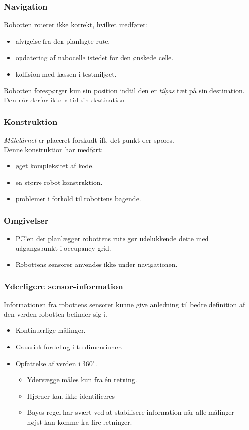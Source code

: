 \begin{frame}
\frametitle{Navigation}
Robotten roterer ikke korrekt, hvilket medfører:
\begin{itemize}
\item afvigelse fra den planlagte rute.
\item opdatering af nabocelle istedet for den ønskede celle.
\item kollision med kassen i testmiljøet.
\end{itemize}
\pause
Robotten forespørger kun sin position indtil den er \textit{tilpas} tæt på sin destination.
Den når derfor ikke altid sin destination.
\end{frame}

\begin{frame}
\frametitle{Konstruktion}
\textit{Måletårnet} er placeret forskudt ift. det punkt der spores.\\
Denne konstruktion har medført:
\begin{itemize}
\item øget kompleksitet af kode.
\item en større robot konstruktion.
\item problemer i forhold til robottens bagende.
\end{itemize}
\end{frame}

\begin{frame}
\frametitle{Omgivelser}
\begin{itemize}
\item PC'en der planlægger robottens rute gør udelukkende dette med udgangspunkt i occupancy grid.
\item Robottens sensorer anvendes ikke under navigationen.
\end{itemize}
\centering
{}
\end{frame}

\begin{frame}
\frametitle{Yderligere sensor-information}
Informationen fra robottens sensorer kunne give anledning til bedre definition af den verden robotten befinder sig i.
\begin{itemize}
\item Kontinuerlige målinger.
\item Gaussisk fordeling i to dimensioner.
\item Opfattelse af verden i 360$^\circ$.
\begin{itemize}
\item Ydervægge måles kun fra \'en retning.
\item Hjørner kan ikke identificeres
\item Bayes regel har svært ved at stabilisere information når alle målinger højst kan komme fra fire retninger.
\end{itemize}
\end{itemize}
\end{frame}

